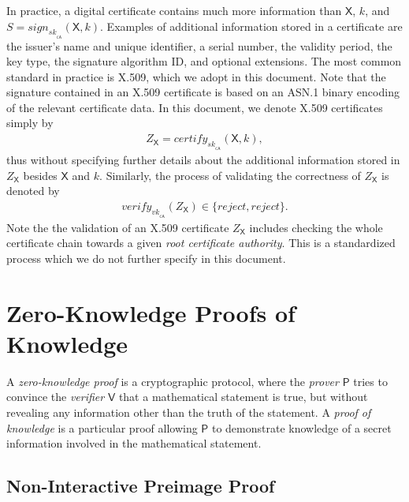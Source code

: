 \documentclass[bibtotoc,halfparskip,oneside]{scrreprt}
\newcommand{\sk}[1]{\mathit{sk}_{#1}\xspace}
\newcommand{\vk}[1]{\mathit{vk}_{#1}\xspace}
\newcommand{\SK}[1]{\sk{_#1}\xspace}
\newcommand{\VK}[1]{\vk{_#1}\xspace}
\newcommand{\CA}{\ensuremath{\mathsf{CA}}\xspace}
\newcommand{\Prover}{\ensuremath{\mathsf{P}}\xspace}
\newcommand{\Verifier}{\ensuremath{\mathsf{V}}\xspace}
\begin{document}
In practice, a digital certificate contains much more information than $\mathsf{X}$, $k$, and $S=\mathit{sign}_{\SK{\CA}}(\mathsf{X},k)$. Examples of additional information stored in a certificate are the issuer's name and unique identifier, a serial number, the validity period, the key type, the signature algorithm ID, and optional extensions. The most common standard in practice is X.509, which we adopt in this document. Note that the signature contained in an X.509 certificate is based on an ASN.1 binary encoding of the relevant certificate data. In this document, we denote X.509 certificates simply by
\begin{align}
	Z_{\mathsf{X}}=\mathit{certify}_{\SK{\CA}}(\mathsf{X},k),
\end{align}
thus without specifying further details about the additional information stored in $Z_{\mathsf{X}}$ besides $\mathsf{X}$ and $k$. Similarly, the process of validating the correctness of $Z_{\mathsf{X}}$ is denoted by 
\begin{align}
	\mathit{verify}_{\VK{\CA}}(Z_{\mathsf{X}})\in\{\mathit{reject},\mathit{reject}\}.
\end{align}
Note the the validation of an X.509 certificate $Z_{\mathsf{X}}$ includes checking the whole certificate chain towards a given \emph{root certificate authority}. This is a standardized process which we do not further specify  in this document.

\section{Zero-Knowledge Proofs of Knowledge}\label{zkp}

A \emph{zero-knowledge proof} is a cryptographic protocol, where the \emph{prover} $\Prover$ tries to convince the \emph{verifier} $\Verifier$ that a mathematical statement is true, but without revealing any  information other than the truth of the statement. A \emph{proof of knowledge} is a particular proof allowing $\Prover$ to demonstrate knowledge of a secret information involved in the mathematical statement.

\subsection{Non-Interactive Preimage Proof}
\end{document}
